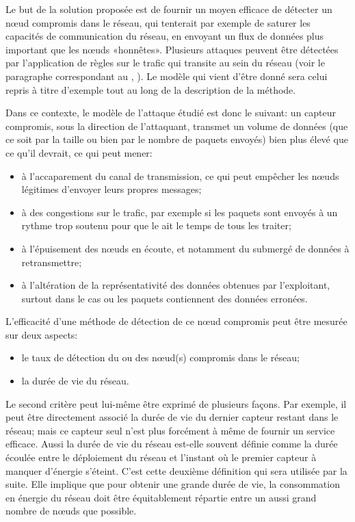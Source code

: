Le but de la solution proposée est de fournir un moyen efficace de détecter un nœud compromis dans le réseau, qui tenterait par exemple de saturer les capacités de communication du réseau, en envoyant un flux de données plus important que les nœuds «honnêtes».
Plusieurs attaques peuvent être détectées par l'application de règles sur le trafic qui transite au sein du réseau (voir le paragraphe correspondant au , ).
Le modèle qui vient d'être donné sera celui repris à titre d'exemple tout au long de la description de la méthode.

Dans ce contexte, le modèle de l'attaque étudié est donc le suivant: un capteur compromis, sous la direction de l'attaquant, transmet un volume de données (que ce soit par la taille ou bien par le nombre de paquets envoyés) bien plus élevé que ce qu'il devrait, ce qui peut mener:
\begin{itemize}
    \item à l'accaparement du canal de transmission, ce qui peut empêcher les nœuds légitimes d'envoyer leurs propres messages;
    \item à des congestions sur le trafic, par exemple si les paquets sont envoyés à un rythme trop soutenu pour que le \CH ait le temps de tous les traiter;
    \item à l'épuisement des nœuds en écoute, et notamment du \ch submergé de données à retransmettre;
    \item à l'altération de la représentativité des données obtenues par l'exploitant, surtout dans le cas ou les paquets contiennent des données erronées.
\end{itemize}

L'efficacité d'une méthode de détection de ce nœud compromis peut être mesurée sur deux aspects:
\begin{itemize}
    \item le taux de détection du ou des nœud(s) compromis dans le réseau;
    \item la durée de vie du réseau.
\end{itemize}
Le second critère peut lui-même être exprimé de plusieurs façons.
Par exemple, il peut être directement associé la durée de vie du dernier capteur restant dans le réseau; mais ce capteur seul n'est plus forcément à même de fournir un service efficace.
Aussi la durée de vie du réseau est-elle souvent définie comme la durée écoulée entre le déploiement du réseau et l'instant où le premier capteur à manquer d'énergie s'éteint.
C'est cette deuxième définition qui sera utilisée par la suite.
Elle implique que pour obtenir une grande durée de vie, la consommation en énergie du réseau doit être équitablement répartie entre un aussi grand nombre de nœuds que possible.


